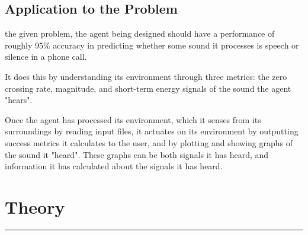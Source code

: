 \documentclass{tufte-handout}
\begin{document}
\subsection{Application to the Problem}
 the given problem, the agent being designed should have a performance of roughly 95\% accuracy in predicting whether some sound it processes is speech or silence in a phone call. \par
It does this by understanding its environment through three metrics: the zero crossing rate, magnitude, and short-term energy signals of the sound the agent "hears".\par
Once the agent has processed its environment, which it senses from its surroundings by reading input files, it actuates on its environment by outputting success metrics it calculates to the user, and by plotting and showing graphs of the sound it "heard". These graphs can be both signals it has heard, and information it has calculated about the signals it has heard.

\clearpage
\section{Theory}
\noindent\rule{2cm}{0.4pt}\\
\end{document}
